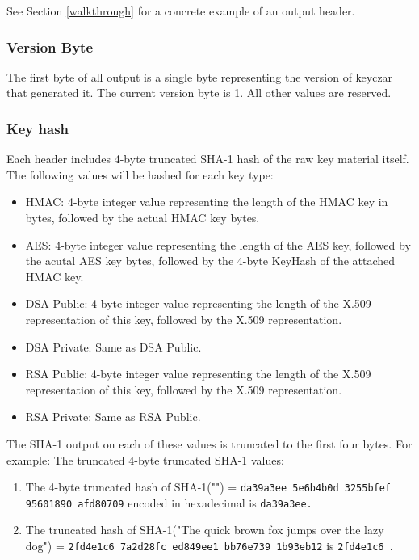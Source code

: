 \documentclass{llncs}
\begin{document}
See Section \ref{walkthrough} for a concrete example of an output header.

\subsubsection{Version Byte}

The first byte of all output is a single byte representing the version of
keyczar that generated it. The current version byte is 1. All other values are
reserved.

\subsubsection{Key hash}\label{keyhash}

Each header includes 4-byte truncated SHA-1 hash of the raw key
material itself. The following values will be hashed for each key type:
\begin{itemize}
  \item HMAC: 4-byte integer value representing the length of the HMAC key in
  bytes, followed by the actual HMAC key bytes.
  \item AES: 4-byte integer value representing the length of the AES key,
  followed by the acutal AES key bytes, followed by the 4-byte KeyHash of the
  attached HMAC key.
  \item DSA Public: 4-byte integer value representing the length of the X.509
  representation of this key, followed by the X.509 representation.
  \item DSA Private: Same as DSA Public.
  \item RSA Public: 4-byte integer value representing the length of the X.509
  representation of this key, followed by the X.509 representation.
  \item RSA Private: Same as RSA Public. 
\end{itemize}

The SHA-1 output on each of these values is truncated to the first four bytes.
For example: The truncated 4-byte truncated SHA-1 values:
\begin{enumerate}
  \item The 4-byte truncated hash of SHA-1("") = {\tt da39a3ee 5e6b4b0d 3255bfef
  95601890 afd80709} encoded in hexadecimal is {\tt da39a3ee.}
  \item The truncated hash of SHA-1("The quick brown fox jumps over the lazy
  dog") = {\tt 2fd4e1c6 7a2d28fc ed849ee1 bb76e739 1b93eb12} is
  {\tt 2fd4e1c6 }.
\end{enumerate}
\end{document}

